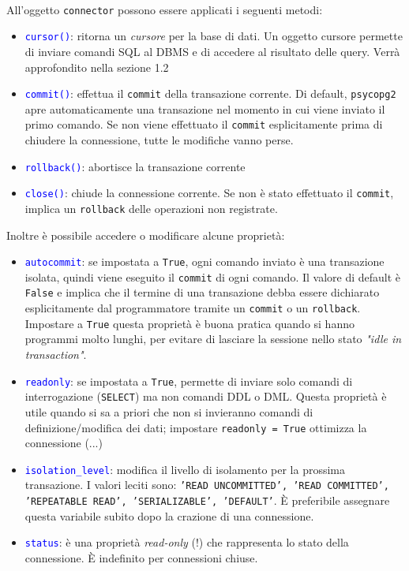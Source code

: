 \documentclass[12pt,a4paper]{book}
\begin{document}
	\paragraph{} All'oggetto \texttt{connector} possono essere applicati i seguenti metodi:
	\begin{itemize}
		\item \textcolor{blue}{\texttt{cursor()}}: ritorna un \textit{cursore} per la base di dati. Un oggetto cursore permette di inviare comandi SQL al DBMS e di accedere al risultato delle query. Verrà approfondito nella sezione 1.2
		\item \textcolor{blue}{\texttt{commit()}}: effettua il \texttt{commit} della transazione corrente. Di default, \texttt{psycopg2} apre automaticamente una transazione nel momento in cui viene inviato il primo comando. Se non viene effettuato il \texttt{commit} esplicitamente prima di chiudere la connessione, tutte le modifiche vanno perse.
		\item \textcolor{blue}{\texttt{rollback()}}: abortisce la transazione corrente
		\item \textcolor{blue}{\texttt{close()}}: chiude la connessione corrente. Se non è stato effettuato il \texttt{commit}, implica un \texttt{rollback} delle operazioni non registrate.
	\end{itemize}
	Inoltre è possibile accedere o modificare alcune proprietà:
	\begin{itemize}
		\item \textcolor{blue}{\texttt{autocommit}}: se impostata a \texttt{True}, ogni comando inviato è una transazione isolata, quindi viene eseguito il \texttt{commit} di ogni comando. Il valore di default è \texttt{False} e implica che il termine di una transazione debba essere dichiarato esplicitamente dal programmatore tramite un \texttt{commit} o un \texttt{rollback}. Impostare a \texttt{True} questa proprietà è buona pratica quando si hanno programmi molto lunghi, per evitare di lasciare la sessione nello stato \textit{"idle in transaction"}.
		\item \textcolor{blue}{\texttt{readonly}}: se impostata a \texttt{True}, permette di inviare solo comandi di interrogazione (\texttt{SELECT}) ma non comandi DDL o DML. Questa proprietà è utile quando si sa a priori che non si invieranno comandi di definizione/modifica dei dati; impostare \texttt{readonly = True} ottimizza la connessione (...)
		\item \textcolor{blue}{\texttt{isolation_level}}: modifica il livello di isolamento per la prossima transazione. I valori leciti sono: \texttt{'READ UNCOMMITTED', 'READ COMMITTED', 'REPEATABLE READ', 'SERIALIZABLE', 'DEFAULT'}. È preferibile assegnare questa variabile subito dopo la crazione di una connessione.
		\item \textcolor{blue}{\texttt{status}}: è una proprietà \textit{read-only} (!) che rappresenta lo stato della connessione. È indefinito per connessioni chiuse.
	\end{itemize}
\end{document}
